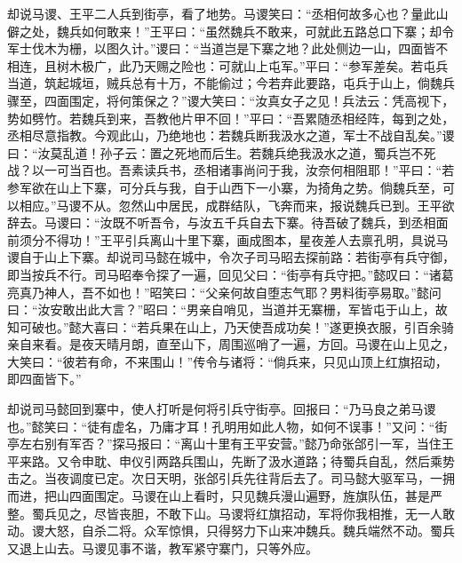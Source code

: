 却说马谡、王平二人兵到街亭，看了地势。马谡笑曰：“丞相何故多心也？量此山僻之处，魏兵如何敢来！”王平曰：“虽然魏兵不敢来，可就此五路总口下寨；却令军士伐木为栅，以图久计。”谡曰：“当道岂是下寨之地？此处侧边一山，四面皆不相连，且树木极广，此乃天赐之险也：可就山上屯军。”平曰：“参军差矣。若屯兵当道，筑起城垣，贼兵总有十万，不能偷过；今若弃此要路，屯兵于山上，倘魏兵骤至，四面围定，将何策保之？”谡大笑曰：“汝真女子之见！兵法云：凭高视下，势如劈竹。若魏兵到来，吾教他片甲不回！”平曰：“吾累随丞相经阵，每到之处，丞相尽意指教。今观此山，乃绝地也：若魏兵断我汲水之道，军士不战自乱矣。”谡曰：“汝莫乱道！孙子云：置之死地而后生。若魏兵绝我汲水之道，蜀兵岂不死战？以一可当百也。吾素读兵书，丞相诸事尚问于我，汝奈何相阻耶！”平曰：“若参军欲在山上下寨，可分兵与我，自于山西下一小寨，为掎角之势。倘魏兵至，可以相应。”马谡不从。忽然山中居民，成群结队，飞奔而来，报说魏兵已到。王平欲辞去。马谡曰：“汝既不听吾令，与汝五千兵自去下寨。待吾破了魏兵，到丞相面前须分不得功！”王平引兵离山十里下寨，画成图本，星夜差人去禀孔明，具说马谡自于山上下寨。却说司马懿在城中，令次子司马昭去探前路：若街亭有兵守御，即当按兵不行。司马昭奉令探了一遍，回见父曰：“街亭有兵守把。”懿叹曰：“诸葛亮真乃神人，吾不如也！”昭笑曰：“父亲何故自堕志气耶？男料街亭易取。”懿问曰：“汝安敢出此大言？”昭曰：“男亲自哨见，当道并无寨栅，军皆屯于山上，故知可破也。”懿大喜曰：“若兵果在山上，乃天使吾成功矣！”遂更换衣服，引百余骑亲自来看。是夜天晴月朗，直至山下，周围巡哨了一遍，方回。马谡在山上见之，大笑曰：“彼若有命，不来围山！”传令与诸将：“倘兵来，只见山顶上红旗招动，即四面皆下。”

却说司马懿回到寨中，使人打听是何将引兵守街亭。回报曰：“乃马良之弟马谡也。”懿笑曰：“徒有虚名，乃庸才耳！孔明用如此人物，如何不误事！”又问：“街亭左右别有军否？”探马报曰：“离山十里有王平安营。”懿乃命张郃引一军，当住王平来路。又令申耽、申仪引两路兵围山，先断了汲水道路；待蜀兵自乱，然后乘势击之。当夜调度已定。次日天明，张郃引兵先往背后去了。司马懿大驱军马，一拥而进，把山四面围定。马谡在山上看时，只见魏兵漫山遍野，旌旗队伍，甚是严整。蜀兵见之，尽皆丧胆，不敢下山。马谡将红旗招动，军将你我相推，无一人敢动。谡大怒，自杀二将。众军惊惧，只得努力下山来冲魏兵。魏兵端然不动。蜀兵又退上山去。马谡见事不谐，教军紧守寨门，只等外应。

